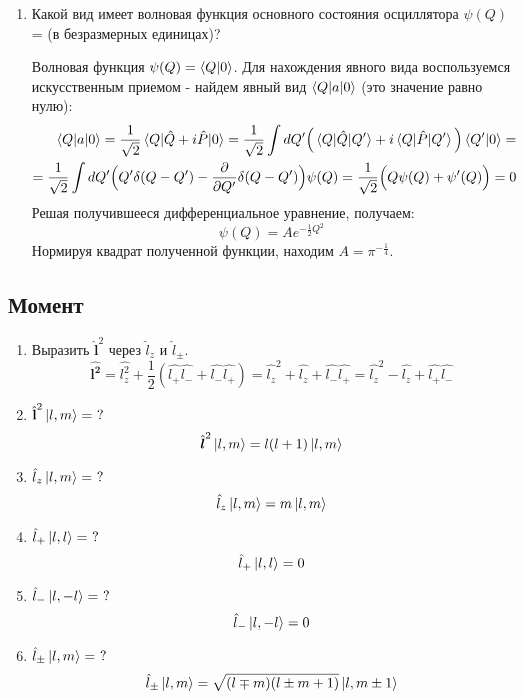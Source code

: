 \documentclass{article}
\begin{document}
\begin{enumerate}
	\item {Какой вид имеет волновая функция основного состояния осциллятора $\psi(Q)$= (в безразмерных единицах)?}
	
	Волновая функция $\psi(Q) = \braket{Q|0}$. Для нахождения явного вида воспользуемся искусственным приемом - найдем явный вид $\braket{Q|a|0}$ (это значение равно нулю):
	\begin{equation}
	\begin{split}
		\braket{Q|a|0} = \frac{1}{\sqrt{2}}\braket{Q|\hat{Q} + i \hat{P}|0} = \frac{1}{\sqrt{2}}\int dQ' \Big( \braket{Q|\hat{Q}|Q'} + i\braket{Q|\hat{P}|Q'} \Big)\braket{Q'|0} = \\ =\frac{1}{\sqrt{2}}\int dQ'\Big(Q'\delta(Q-Q') - \frac{\partial}{\partial Q'}\delta(Q-Q') \Big) \psi(Q) = \frac{1}{\sqrt{2}} \Big(Q\psi(Q) + \psi'(Q)\Big) = 0
	\end{split}
	\end{equation}	
	Решая получившееся дифференциальное уравнение, получаем:
	\begin{equation}
		\psi(Q) = A e^{-\frac{1}{2}Q^2}
	\end{equation}
	Нормируя квадрат полученной функции, находим $A = \pi^{-\frac{1}{4}}$.
\end{enumerate}


\subsection*{Момент}
	\begin{enumerate}
		\item {Выразить $\hat{\textbf{l}}^2$ через $\hat{l}_z$ и $\hat{l}_\pm$.}	
		\begin{equation}
			\hat{\boldsymbol{l^{2}}}=\hat{l_{z}^{2}}+\frac{1}{2}(\hat{l_{+}}\hat{l_{-}}+\hat{l_{-}}\hat{l_{+}})=\hat{l_{z}}^{2}+\hat{l_{z}}+\hat{l_{-}}\hat{l_{+}}=\hat{l_{z}}^{2}-\hat{l_{z}}+\hat{l_{+}}\hat{l_{-}}
		\end{equation}
		\item {$\hat{\textbf{l}}^2 \ket{l, m} = \ ?$}
		\begin{equation}
			\hat{\boldsymbol{l}}^2\ket{l,m}=l(l+1)\ket{l,m}
		\end{equation}			
		\item {$\hat{l}_z \ket{l, m} = \ ?$}
		\begin{equation}
			\hat{l}_z\ket{l,m}=m\ket{l,m}
		\end{equation}	
		\item {$\hat{l}_+ \ket{l, l} = \ ?$}
		\begin{equation}
			\hat{l}_+\ket{l,l}=0
		\end{equation}	
		\item {$\hat{l}_- \ket{l, -l} = \ ?$}
		\begin{equation}
			\hat{l}_-\ket{l,-l}=0
		\end{equation}		
		\item {$\hat{l}_\pm \ket{l, m} = \ ?$}
		\begin{equation}
			\hat{l}_\pm\ket{l,m}=\sqrt{(l\mp m)(l\pm m+1)}\ket{l,m\pm1}
		\end{equation}	
	\end{enumerate}
	
\end{document}
